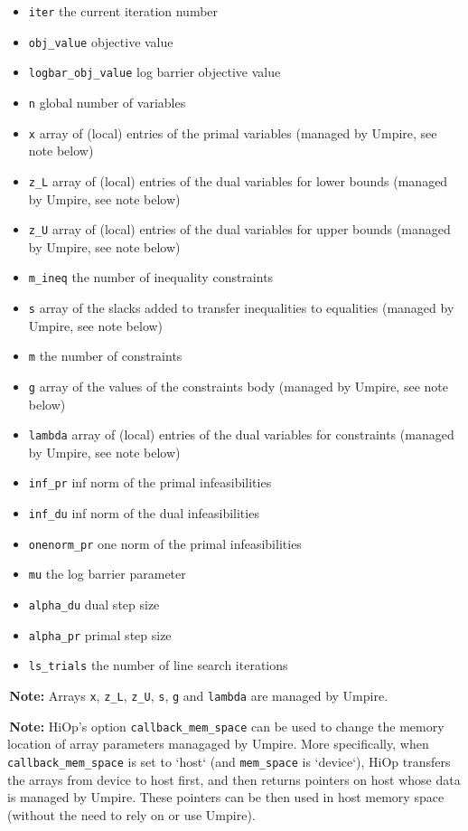 \documentclass[11pt]{article}
\newcounter{line}
\newcommand{\warningSymbol}{\raisebox{0.9\depth}{\danger}}
\newcommand{\warningcp}[1]{%
        \smallskip \noindent \textcolor{warningColorText}{\warningSymbol{}}\,\textbf{#1} %
    }
\begin{document}
\begin{itemize}
\item \texttt{iter} the current iteration number
\item \texttt{obj\_value} objective value
\item \texttt{logbar\_obj\_value} log barrier objective value
\item \texttt{n} global number of variables
\item \texttt{x} array of (local) entries of the primal variables (managed by Umpire, see note below)
\item \texttt{z\_L} array of (local) entries of the dual variables for lower bounds (managed by Umpire, see note below)
\item \texttt{z\_U} array of (local) entries of the dual variables for upper bounds (managed by Umpire, see note below)
\item \texttt{m\_ineq} the number of inequality constraints
\item \texttt{s} array of the slacks added to transfer inequalities to equalities (managed by Umpire, see note below)
\item \texttt{m} the number of constraints
\item \texttt{g} array of the values of the constraints body (managed by Umpire, see note below)
\item \texttt{lambda} array of (local) entries of the dual variables for constraints (managed by Umpire, see note below)
\item \texttt{inf\_pr} inf norm of the primal infeasibilities
\item \texttt{inf\_du} inf norm of the dual infeasibilities
\item \texttt{onenorm\_pr} one norm of the primal infeasibilities
\item \texttt{mu} the log barrier parameter
\item \texttt{alpha\_du} dual step size
\item \texttt{alpha\_pr} primal step size
\item \texttt{ls\_trials} the number of line search iterations
\end{itemize}

\warningcp{Note:} Arrays \texttt{x}, \texttt{z\_L}, \texttt{z\_U}, \texttt{s}, \texttt{g} and \texttt{lambda} are managed by Umpire.

\warningcp{Note:} HiOp's option \texttt{callback\_mem\_space} can be used to change the memory location of array parameters managaged by Umpire. More specifically, when \texttt{callback\_mem\_space} is set to `host` (and \texttt{mem\_space} is `device`), HiOp transfers the arrays from device to host first, and then returns pointers on host whose data is managed by Umpire. These pointers can be then used in host memory space (without the need to rely on or use Umpire).
\end{document}

